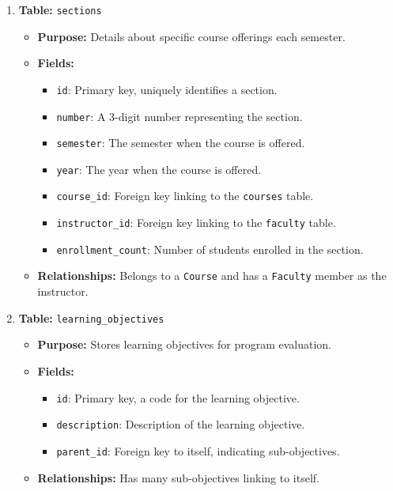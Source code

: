\documentclass{article}
\begin{document}
\begin{enumerate}
		    \item \textbf{Table:} \texttt{sections}
		    \begin{itemize}
		        \item \textbf{Purpose:} Details about specific course offerings each semester.
		        \item \textbf{Fields:}
		        \begin{itemize}
		            \item \texttt{id}: Primary key, uniquely identifies a section.
		            \item \texttt{number}: A 3-digit number representing the section.
		            \item \texttt{semester}: The semester when the course is offered.
		            \item \texttt{year}: The year when the course is offered.
		            \item \texttt{course\_id}: Foreign key linking to the \texttt{courses} table.
		            \item \texttt{instructor\_id}: Foreign key linking to the \texttt{faculty} table.
		            \item \texttt{enrollment\_count}: Number of students enrolled in the section.
		        \end{itemize}
		        \item \textbf{Relationships:} Belongs to a \texttt{Course} and has a \texttt{Faculty} member as the instructor.
		    \end{itemize}

		    \item \textbf{Table:} \texttt{learning\_objectives}
		    \begin{itemize}
		        \item \textbf{Purpose:} Stores learning objectives for program evaluation.
		        \item \textbf{Fields:}
		        \begin{itemize}
		            \item \texttt{id}: Primary key, a code for the learning objective.
		            \item \texttt{description}: Description of the learning objective.
		            \item \texttt{parent\_id}: Foreign key to itself, indicating sub-objectives.
		        \end{itemize}
		        \item \textbf{Relationships:} Has many sub-objectives linking to itself.
		    \end{itemize}


\end{enumerate}
\end{document}
